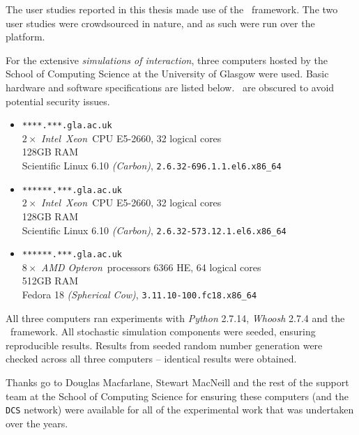 
\begin{preamble}


The user studies reported in this thesis made use of the \treconomics~framework. The two user studies were crowdsourced in nature, and as such were run over the~ platform.

For the extensive \emph{simulations of interaction}, three computers hosted by the School of Computing Science at the University of Glasgow were used. Basic hardware and software specifications are listed below.~ are obscured to avoid potential security issues.

\begin{itemize}
    
    \item{\texttt{****.***.gla.ac.uk}\\$2\times$ \emph{Intel}\textregistered~\emph{Xeon}\textregistered~CPU E5-2660, 32 logical cores\\128GB RAM\\Scientific Linux 6.10 \emph{(Carbon)}, \texttt{2.6.32-696.1.1.el6.x86\_64}}
    
    \item{\texttt{******.***.gla.ac.uk}\\$2\times$ \emph{Intel}\textregistered~\emph{Xeon}\textregistered~CPU E5-2660, 32 logical cores\\128GB RAM\\Scientific Linux 6.10 \emph{(Carbon)}, \texttt{2.6.32-573.12.1.el6.x86\_64}}
    
    \item{\texttt{******.***.gla.ac.uk}\\$8\times$ \emph{AMD Opteron}\texttrademark~processors 6366 HE, 64 logical cores\\512GB RAM\\Fedora 18 \emph{(Spherical Cow)}, \texttt{3.11.10-100.fc18.x86\_64}}
    
\end{itemize}

All three computers ran experiments with \emph{Python} 2.7.14, \emph{Whoosh} 2.7.4 and the \simiir~framework. All stochastic simulation components were seeded, ensuring reproducible results. Results from seeded random number generation were checked across all three computers -- identical results were obtained.

Thanks go to Douglas Macfarlane, Stewart MacNeill and the rest of the support team at the School of Computing Science for ensuring these computers (and the \texttt{DCS} network) were available for all of the experimental work that was undertaken over the years.
\end{preamble}

\newpage
\thispagestyle{empty}
\mbox{}
\newpage
\thispagestyle{empty}
\mbox{}
\newpage
